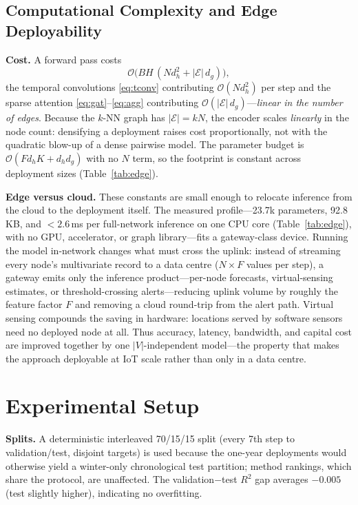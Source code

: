 \documentclass[journal]{IEEEtran}
\newcommand{\Rtwo}{\ensuremath{R^{2}}\xspace}
\begin{document}
\subsection{Computational Complexity and Edge Deployability}\label{sec:complexity}
\textbf{Cost.} A forward pass costs
\begin{equation}
\mathcal{O}\!\big(B H\,(N d_h^2 + |\mathcal{E}|\,d_g)\big),
\label{eq:complexity}
\end{equation}
the temporal convolutions \eqref{eq:tconv} contributing $\mathcal{O}(N d_h^2)$ per step and the sparse attention \eqref{eq:gat}--\eqref{eq:agg} contributing $\mathcal{O}(|\mathcal{E}|\,d_g)$---\emph{linear in the number of edges}. Because the $k$-NN graph has $|\mathcal{E}|=kN$, the encoder scales \emph{linearly} in the node count: densifying a deployment raises cost proportionally, not with the quadratic blow-up of a dense pairwise model. The parameter budget is $\mathcal{O}(F d_h K + d_h d_g)$ with no $N$ term, so the footprint is constant across deployment sizes (Table~\ref{tab:edge}).

\textbf{Edge versus cloud.} These constants are small enough to relocate inference from the cloud to the deployment itself. The measured profile---23.7k parameters, 92.8\,KB, and ${<}2.6$\,ms per full-network inference on one CPU core (Table~\ref{tab:edge}), with no GPU, accelerator, or graph library---fits a gateway-class device. Running the model in-network changes what must cross the uplink: instead of streaming every node's multivariate record to a data centre ($N{\times}F$ values per step), a gateway emits only the inference product---per-node forecasts, virtual-sensing estimates, or threshold-crossing alerts---reducing uplink volume by roughly the feature factor $F$ and removing a cloud round-trip from the alert path. Virtual sensing compounds the saving in hardware: locations served by software sensors need no deployed node at all. Thus accuracy, latency, bandwidth, and capital cost are improved together by one $|V|$-independent model---the property that makes the approach deployable at IoT scale rather than only in a data centre.

\section{Experimental Setup}\label{sec:setup}
\textbf{Splits.} A deterministic interleaved 70/15/15 split (every 7th step to validation/test, disjoint targets) is used because the one-year deployments would otherwise yield a winter-only chronological test partition; method rankings, which share the protocol, are unaffected. The validation$-$test \Rtwo gap averages $-0.005$ (test slightly higher), indicating no overfitting.
\end{document}

